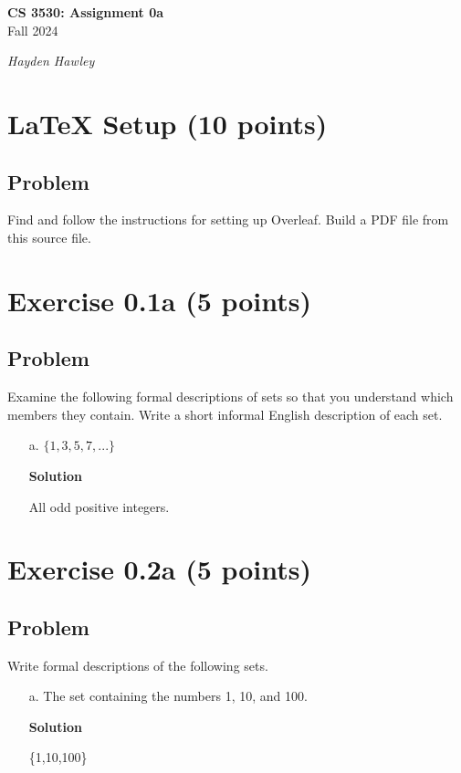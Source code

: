 \documentclass{article}
\begin{document}
\begin{empfile}

\begin{center}
\textbf{\Large CS 3530: Assignment 0a} \\[2mm]
Fall 2024

\emph{Hayden Hawley}
\end{center}

\raggedright

\section*{LaTeX Setup (10 points)}

\subsection*{Problem}

Find and follow the instructions for setting up Overleaf. Build a PDF file from this source file.

\section*{Exercise 0.1a (5 points)}

\subsection*{Problem}

Examine the following formal descriptions of sets so that you understand which members they contain.  Write a short informal English description of each set.

\begin{itemize}
\item[a.] $\{ 1, 3, 5, 7, ...\}$

\textbf{Solution}

All odd positive integers.

\end{itemize}

\section*{Exercise 0.2a (5 points)}

\subsection*{Problem}

Write formal descriptions of the following sets.

\begin{itemize}
\item[a.] The set containing the numbers 1, 10, and 100.

\textbf{Solution}

\{1,10,100\}

\end{itemize}

\end{empfile}
\immediate{}
\end{document}
